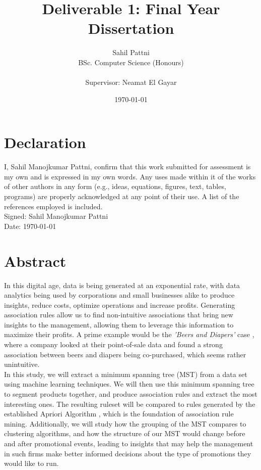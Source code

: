 \documentclass[a4paper,11pt]{article}
\begin{document}
\title{Deliverable 1: Final Year Dissertation}
\author{
	Sahil Pattni\\ 
	BSc. Computer Science (Honours)\\\\
	Supervisor: Neamat El Gayar
	}
\date{\today}
\maketitle
{}
\newpage
\section*{Declaration} 
I, Sahil Manojkumar Pattni, confirm that this work submitted for assessment is my own and is expressed in my own words. Any uses made within it of the works of other authors in any form (e.g., ideas, equations, figures, text, tables, programs) are properly acknowledged at any point of their use. A list of the references employed is included. 
\\
Signed: Sahil Manojkumar Pattni\\
Date: \today

\section*{Abstract}
In this digital age, data is being generated at an exponential rate, with data analytics being used by corporations and small businesses alike to produce insights, reduce costs, optimize operations and increase profits.  Generating association rules allow us to find non-intuitive associations that bring new insights to the management, allowing them to leverage this information to maximize their profits. A prime example would be the \textit{'Beers and Diapers'} case \cite{beers_diapers}, where a company looked at their point-of-sale data and found a strong association between beers and diapers being co-purchased, which seems rather unintuitive.\\
In this study, we will extract a minimum spanning tree (MST) from a data set using machine learning techniques. We will then use this minimum spanning tree to segment products together,  and produce association rules and extract the most interesting ones. The resulting ruleset will be compared to rules generated by the established Apriori Algorithm \cite{apriori}, which is the foundation of association rule mining.  Additionally, we will study how the grouping of the MST compares to clustering algorithms, and how the structure of our MST would change before and after promotional events, leading to insights that may help the management in such firms make better informed decisions about the type of promotions they would like to run.
\end{document}
